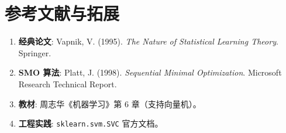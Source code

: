 \documentclass[12pt, a4paper]{article}
\begin{document}
\section{参考文献与拓展}
\begin{enumerate}
    \item \textbf{经典论文}: Vapnik, V. (1995). \textit{The Nature of Statistical Learning Theory}. Springer.
    \item \textbf{SMO 算法}: Platt, J. (1998). \textit{Sequential Minimal Optimization}. Microsoft Research Technical Report.
    \item \textbf{教材}: 周志华《机器学习》第 6 章（支持向量机）。
    \item \textbf{工程实践}: \texttt{sklearn.svm.SVC} 官方文档。
\end{enumerate}
\end{document}
